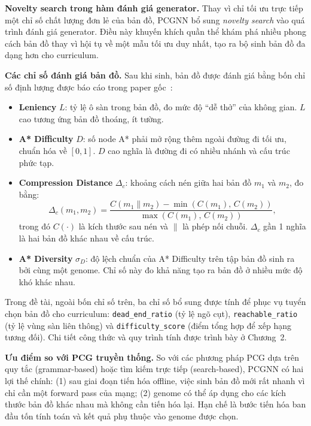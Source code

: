 \textbf{Novelty search trong hàm đánh giá generator.} Thay vì chỉ tối ưu trực tiếp một chỉ số chất lượng đơn lẻ của bản đồ, PCGNN bổ sung \textit{novelty search} vào quá trình đánh giá generator. Điều này khuyến khích quần thể khám phá nhiều phong cách bản đồ thay vì hội tụ về một mẫu tối ưu duy nhất, tạo ra bộ sinh bản đồ đa dạng hơn cho curriculum.

\textbf{Các chỉ số đánh giá bản đồ.} Sau khi sinh, bản đồ được đánh giá bằng bốn chỉ số định lượng được báo cáo trong paper gốc~\cite{Beukman2022}:

\begin{itemize}
    \item \textbf{Leniency} $L$: tỷ lệ ô sàn trong bản đồ, đo mức độ ``dễ thở'' của không gian. $L$ cao tương ứng bản đồ thoáng, ít tường.
    \item \textbf{A* Difficulty} $D$: số node A* phải mở rộng thêm ngoài đường đi tối ưu, chuẩn hóa về $[0,1]$. $D$ cao nghĩa là đường đi có nhiều nhánh và cấu trúc phức tạp.
    \item \textbf{Compression Distance} $\Delta_c$: khoảng cách nén giữa hai bản đồ $m_1$ và $m_2$, đo bằng:
        \begin{equation}
            \Delta_c(m_1, m_2) = \frac{C(m_1 \| m_2) - \min(C(m_1),\, C(m_2))}{\max(C(m_1),\, C(m_2))},
            \label{eq:ncd}
        \end{equation}
        trong đó $C(\cdot)$ là kích thước sau nén và $\|$ là phép nối chuỗi. $\Delta_c$ gần 1 nghĩa là hai bản đồ khác nhau về cấu trúc.
    \item \textbf{A* Diversity} $\sigma_D$: độ lệch chuẩn của A* Difficulty trên tập bản đồ sinh ra bởi cùng một genome. Chỉ số này đo khả năng tạo ra bản đồ ở nhiều mức độ khó khác nhau.
\end{itemize}

Trong đề tài, ngoài bốn chỉ số trên, ba chỉ số bổ sung được tính để phục vụ tuyển chọn bản đồ cho curriculum: \texttt{dead\_end\_ratio} (tỷ lệ ngõ cụt), \texttt{reachable\_ratio} (tỷ lệ vùng sàn liên thông) và \texttt{difficulty\_score} (điểm tổng hợp để xếp hạng tương đối). Chi tiết công thức và quy trình tính được trình bày ở Chương~2.

\textbf{Ưu điểm so với PCG truyền thống.} So với các phương pháp PCG dựa trên quy tắc (grammar-based) hoặc tìm kiếm trực tiếp (search-based), PCGNN có hai lợi thế chính: (1) sau giai đoạn tiến hóa offline, việc sinh bản đồ mới rất nhanh vì chỉ cần một forward pass của mạng; (2) genome có thể áp dụng cho các kích thước bản đồ khác nhau mà không cần tiến hóa lại. Hạn chế là bước tiến hóa ban đầu tốn tính toán và kết quả phụ thuộc vào genome được chọn.

